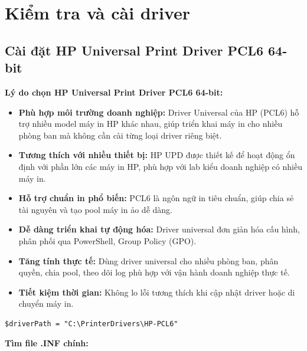 \section{Kiểm tra và cài driver}
\subsection{Cài đặt HP Universal Print Driver PCL6 64-bit}

\noindent\textbf{Lý do chọn HP Universal Print Driver PCL6 64-bit:}

\begin{itemize}[leftmargin=*,noitemsep,topsep=3pt]
    \item \textbf{Phù hợp môi trường doanh nghiệp:} Driver Universal của HP (PCL6) hỗ trợ nhiều model máy in HP khác nhau, giúp triển khai máy in cho nhiều phòng ban mà không cần cài từng loại driver riêng biệt.
    \item \textbf{Tương thích với nhiều thiết bị:} HP UPD được thiết kế để hoạt động ổn định với phần lớn các máy in HP, phù hợp với lab kiểu doanh nghiệp có nhiều máy in.
    \item \textbf{Hỗ trợ chuẩn in phổ biến:} PCL6 là ngôn ngữ in tiêu chuẩn, giúp chia sẻ tài nguyên và tạo pool máy in ảo dễ dàng.
    \item \textbf{Dễ dàng triển khai tự động hóa:} Driver universal đơn giản hóa cấu hình, phân phối qua PowerShell, Group Policy (GPO).
    \item \textbf{Tăng tính thực tế:} Dùng driver universal cho nhiều phòng ban, phân quyền, chia pool, theo dõi log phù hợp với vận hành doanh nghiệp thực tế.
    \item \textbf{Tiết kiệm thời gian:} Không lo lỗi tương thích khi cập nhật driver hoặc di chuyển máy in.
\end{itemize}

\begin{lstlisting}[style=powershell]
$driverPath = "C:\PrinterDrivers\HP-PCL6"
\end{lstlisting}

\noindent\textbf{Tìm file .INF chính:}

